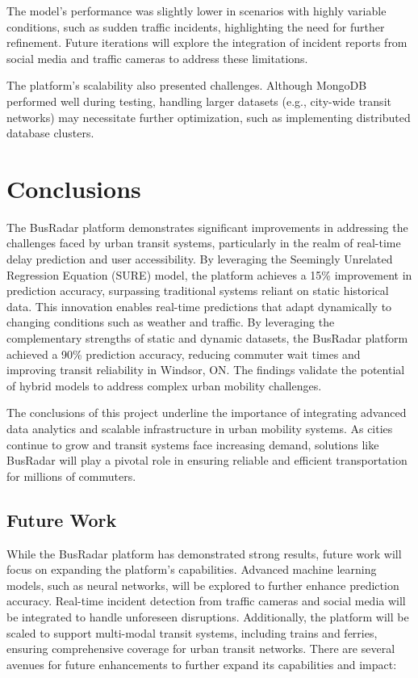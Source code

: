 \documentclass[conference]{IEEEtran}
\begin{document}
The model's performance was slightly lower in scenarios with highly variable conditions, such as sudden traffic incidents, highlighting the need for further refinement. Future iterations will explore the integration of incident reports from social media and traffic cameras to address these limitations. 

The platform's scalability also presented challenges. Although MongoDB performed well during testing, handling larger datasets (e.g., city-wide transit networks) may necessitate further optimization, such as implementing distributed database clusters. 

\section{Conclusions}\label{CFW}
The BusRadar platform demonstrates significant improvements in addressing the challenges faced by urban transit systems, particularly in the realm of real-time delay prediction and user accessibility. By leveraging the Seemingly Unrelated Regression Equation (SURE) model, the platform achieves a 15\% improvement in prediction accuracy, surpassing traditional systems reliant on static historical data. This innovation enables real-time predictions that adapt dynamically to changing conditions such as weather and traffic. By leveraging the complementary strengths of static and dynamic datasets, the BusRadar platform achieved a 90\% prediction accuracy, reducing commuter wait times and improving transit reliability in Windsor, ON. The findings validate the potential of hybrid models to address complex urban mobility challenges. 

The conclusions of this project underline the importance of integrating advanced data analytics and scalable infrastructure in urban mobility systems. As cities continue to grow and transit systems face increasing demand, solutions like BusRadar will play a pivotal role in ensuring reliable and efficient transportation for millions of commuters.

\subsection{Future Work}
While the BusRadar platform has demonstrated strong results, future work will focus on expanding the platform’s capabilities. Advanced machine learning models, such as neural networks, will be explored to further enhance prediction accuracy. Real-time incident detection from traffic cameras and social media will be integrated to handle unforeseen disruptions. Additionally, the platform will be scaled to support multi-modal transit systems, including trains and ferries, ensuring comprehensive coverage for urban transit networks. There are several avenues for future enhancements to further expand its capabilities and impact: 
\end{document}
